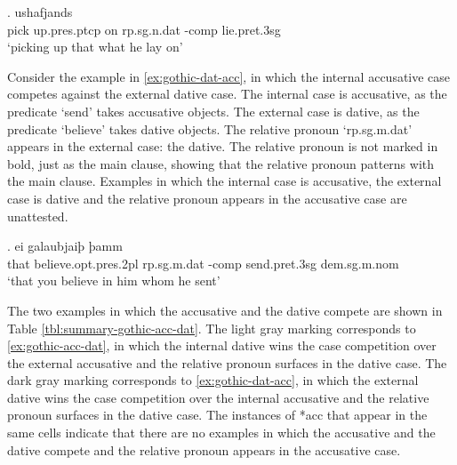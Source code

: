 \exg. ushafjands    \\
{pick up}.\ac{pres}.\ac{ptcp}\scsub{[acc]} on\scsub{[dat]} \ac{rp}.\ac{sg}.\ac{n}.\ac{dat} -\ac{comp} lie.\ac{pret}.3\ac{sg}\\
`picking up that what he lay on' \label{ex:gothic-acc-dat}

Consider the example in \ref{ex:gothic-dat-acc}, in which the internal accusative case competes against the external dative case.
The internal case is accusative, as the predicate  `send' takes accusative objects.
The external case is dative, as the predicate  `believe' takes dative objects.
The relative pronoun  `\ac{rp}.\ac{sg}.\ac{m}.\ac{dat}' appears in the external case: the dative. The relative pronoun is not marked in bold, just as the main clause, showing that the relative pronoun patterns with the main clause.
Examples in which the internal case is accusative, the external case is dative and the relative pronoun appears in the accusative case are unattested.

\exg. ei galaubjaiþ þamm   \\
that believe.\ac{opt}.\ac{pres}.2\ac{pl}\scsub{[dat]} \ac{rp}.\ac{sg}.\ac{m}.\ac{dat} -\ac{comp} {send}.\ac{pret}.3\ac{sg}\scsub{[acc]} \ac{dem}.\ac{sg}.\ac{m}.\ac{nom}\\
`that you believe in him whom he sent' \label{ex:gothic-dat-acc}

The two examples in which the accusative and the dative compete are shown in Table \ref{tbl:summary-gothic-acc-dat}. The light gray marking corresponds to \ref{ex:gothic-acc-dat}, in which the internal dative wins the case competition over the external accusative and the relative pronoun surfaces in the dative case. The dark gray marking corresponds to \ref{ex:gothic-dat-acc}, in which the external dative wins the case competition over the internal accusative and the relative pronoun surfaces in the dative case. The instances of *\ac{acc} that appear in the same cells indicate that there are no examples in which the accusative and the dative compete and the relative pronoun appears in the accusative case.

